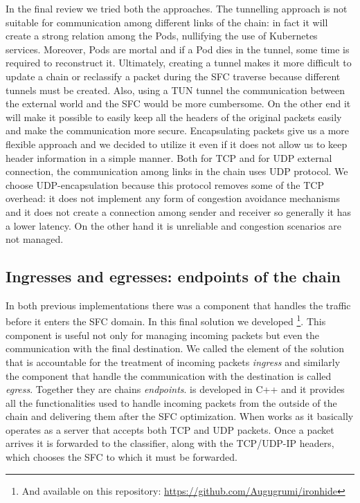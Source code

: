 \vspace*{1cm}

\noindent In the final review we tried both the approaches. The tunnelling
approach is not suitable for communication among different links of the chain:
in fact it will create a strong relation among the Pods, nullifying the use of
Kubernetes services. Moreover, Pods are mortal and if a Pod dies in the tunnel,
some time is required to reconstruct it. Ultimately, creating a tunnel makes it
more difficult to update a chain or reclassify a packet during the SFC traverse
because different tunnels must be created. Also, using a TUN tunnel the
communication between the external world and the SFC would be more cumbersome.
On the other end it will make it possible to easily keep all the headers of the
original packets easily and make the communication more secure. Encapsulating
packets give us a more flexible approach and we decided to utilize it even if it
does not allow us to keep header information in a simple manner. Both for TCP
and for UDP external connection, the communication among links in the chain uses
UDP protocol. We choose UDP-encapsulation because this protocol removes some of
the TCP overhead: it does not implement any form of congestion avoidance
mechanisms and it does not create a connection among sender and receiver so
generally it has a lower latency. On the other hand it is unreliable and
congestion scenarios are not managed.

\subsection{Ingresses and egresses: endpoints of the chain}
\label{chap:impl:subsec:endpoints}
In both previous implementations there was a component that handles the
traffic before it enters the SFC domain. In this final solution we developed 
\ironhide{}\footnote{And available on this repository: 
\url{https://github.com/Augugrumi/ironhide}}. This component is useful not only
for managing incoming packets but even the communication with the final
destination. We called the element of the solution that is accountable for the
treatment of incoming packets \emph{ingress} and similarly the component that
handle the communication with the destination is called \emph{egress}. Together
they are chains \emph{endpoints}. \ironhide{} is developed in C++ and it
provides all the functionalities used to handle incoming packets from the outside
of
the chain and delivering them after the SFC optimization. When \ironhide{} works
as \ingress{} it basically operates as a server that accepts both TCP and UDP
packets. Once a packet arrives it is forwarded to the classifier, along with the
TCP/UDP-IP headers, which chooses the SFC to which it must be forwarded.

